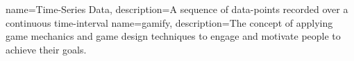  {
  name=Time-Series Data, description={A sequence of data-points recorded over a
  continuous time-interval}
}
 {
  name=gamify, description={The concept of applying game mechanics and game design techniques to engage and motivate people to achieve their goals.}
}
